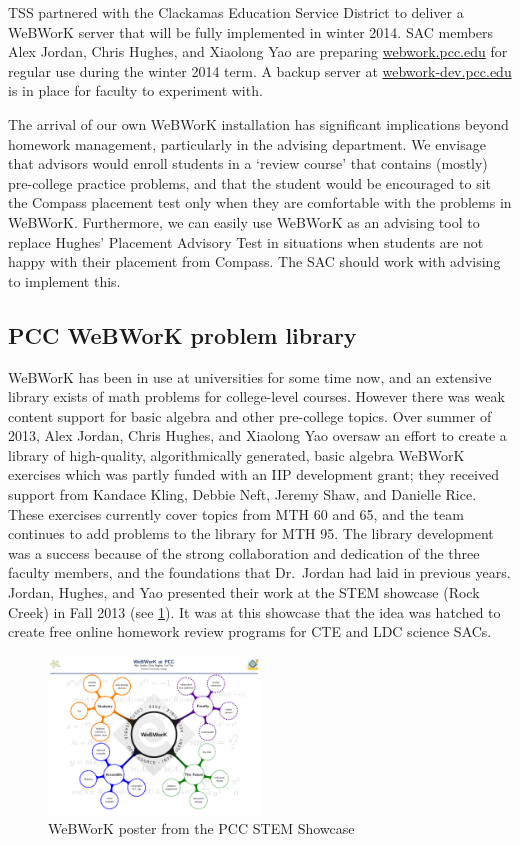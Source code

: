 TSS partnered with the Clackamas Education Service District to deliver a WeBWorK server that will be fully implemented in winter 2014.  SAC members Alex Jordan, Chris Hughes, and Xiaolong Yao are preparing \href{http://webwork.pcc.edu}{webwork.pcc.edu} for regular use during the winter 2014 term. A backup server at \href{http://webwork-dev.pcc.edu}{webwork-dev.pcc.edu} is in place for faculty to experiment with. 

The arrival of our own WeBWorK installation has significant implications beyond homework management, particularly in the advising department. We envisage that advisors would enroll students in a `review course' that contains (mostly) pre-college practice problems, and that the student would be encouraged to sit the Compass placement test only when they are comfortable with the problems in WeBWorK. Furthermore, we can easily use WeBWorK as an advising tool to replace Hughes' Placement Advisory Test in situations when students are not happy with their placement from Compass.  The SAC should work with advising to implement this. 

\subsection{PCC WeBWorK problem library}
WeBWorK has been in use at universities for some time now, and an extensive library exists of math problems for college-level courses. However there was weak content support for basic algebra and other pre-college topics. Over summer of 2013, Alex Jordan, Chris Hughes, and Xiaolong Yao oversaw an effort to create a library of high-quality, algorithmically generated, basic algebra WeBWorK exercises which was partly funded with an IIP development grant; they received support from Kandace Kling, Debbie Neft, Jeremy Shaw, and Danielle Rice.  These exercises currently cover topics from MTH 60 and 65, and the team continues to add problems to the library for MTH 95. The library development was a success because of the strong collaboration and dedication of the three faculty members, and the foundations that Dr.\ Jordan had laid in previous years. Jordan, Hughes, and Yao presented their work at the STEM showcase (Rock Creek) in Fall 2013 (see \cref{webworkposter}). It was at this showcase that the idea was hatched to create free online homework review programs for CTE and LDC science SACs.

\begin{figure}[!htb]
	\centering
	\includegraphics[width=0.5\textwidth]{webworkposter.pdf}
	\caption{WeBWorK poster from the PCC STEM Showcase}\label{webworkposter}
\end{figure}

